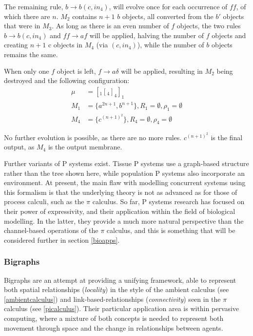 The remaining rule, $b \rightarrow b(c, in_4)$, will evolve once for
each occurrence of $ff$, of which there are $n$.  $M_2$ contains $n + 1$
$b$ objects, all converted from the $b'$ objects that were in $M_3$.  As
long as there is an even number of $f$ objects, the two rules $b
\rightarrow b(c, in_4)$ and $ff \rightarrow af$ will be applied, halving
the number of $f$ objects and creating $n + 1$ c objects in $M_4$ (via
$(c, in_4)$), while the number of $b$ objects remains the same.

When only one $f$ object is left, $f \rightarrow a\delta$ will be
applied, resulting in $M_2$ being destroyed and the following
configuration:
\begin{align*}
\mu & = [_1[_4]_4]_1 \\
M_1 & = \{a^{2n+1},b^{n+1}\}, 
R_1 = \emptyset,
\rho_1 = \emptyset \\
M_4 & = \{c^{(n+1)^2}\},
R_4 = \emptyset,
\rho_4 = \emptyset
\end{align*}

\noindent No further evolution is possible, as there are no more rules.
$c^{(n+1)^2}$ is the final output, as $M_4$ is the output membrane.

Further variants of P systems exist.  Tissue P systems use a graph-based
structure rather than the tree shown here, while population P systems
also incorporate an environment.  At present, the main flaw with
modelling concurrent systems using this formalism is that the underlying
theory is not as advanced as for those of process calculi,
such as the $\pi$ calculus.  So far, P systems research has focused on
their power of expressivity, and their application within the field of
biological modelling.  In the latter, they provide a much more natural
perspective than the channel-based operations of the $\pi$ calculus, and
this is something that will be considered further in section \ref{bioapps}.

\subsubsection{Bigraphs}
\label{bigraphs}

Bigraphs \cite{bigraph1, bigraph2} are an attempt at providing a
unifying framework, able to represent both spatial relationships
(\emph{locality}) in the style of the ambient calculus (see
\ref{ambientcalculus}) and link-based-relationships
(\emph{connectivity}) seen in the $\pi$ calculus (see \ref{picalculus}).
Their particular application area is within pervasive computing, where a
mixture of both concepts is needed to represent both movement through
space and the change in relationships between agents.

